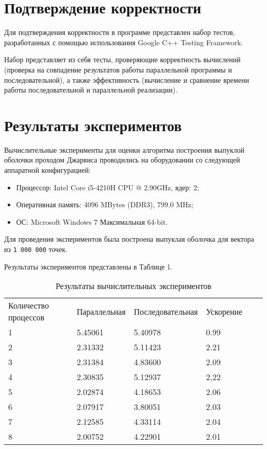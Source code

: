 \documentclass{report}
\begin{document}
\section*{Подтверждение корректности}
Для подтверждения корректности в программе представлен набор тестов, разработанных с помощью использования Google C++ Testing Framework.
\par Набор представляет из себя тесты, проверяющие корректность вычислений (проверка на совпадение результатов работы параллельной программы и последовательной), а также эффективность (вычисление и сравнение времени работы последовательной и параллельной реализации).
\newpage

\section*{Результаты экспериментов}
Вычислительные эксперименты для оценки алгоритма построения выпуклой оболочки проходом Джарвиса проводились на оборудовании со следующей аппаратной конфигурацией:

\begin{itemize}
\item Процессор: Intel Core i5-4210H CPU @ 2.90GHz, ядер: 2;
\item Оперативная память: 4096 MBytes (DDR3), 799.0 MHz;
\item ОС: Microsoft Windows 7 Максимальная 64-bit.
\end{itemize}

\par Для проведения экспериментов была построена выпуклая оболочка для вектора из \verb|1 000 000| точек. 
\par Результаты экспериментов представлены в Таблице 1.

\begin{table}[!h]
\caption{Результаты вычислительных экспериментов}
\centering
\begin{tabular}{llllll}
Количество процессов & Параллельная & Последовательная & Ускорение  \\
1        & 5.45061        & 5.40978      & 0.99                     \\
2        & 2.31332        & 5.11423      & 2.21                     \\
3        & 2.31384        & 4.83600      & 2.09                     \\
4        & 2.30835        & 5.12937      & 2,22                     \\
5        & 2.02874        & 4.18653      & 2.06                     \\
6        & 2.07917        & 3.80051      & 2.03                     \\
7        & 2.12585        & 4.33114      & 2.04                     \\
8        & 2.00752        & 4.22901      & 2.01      
\end{tabular}
\end{table}
\end{document}
